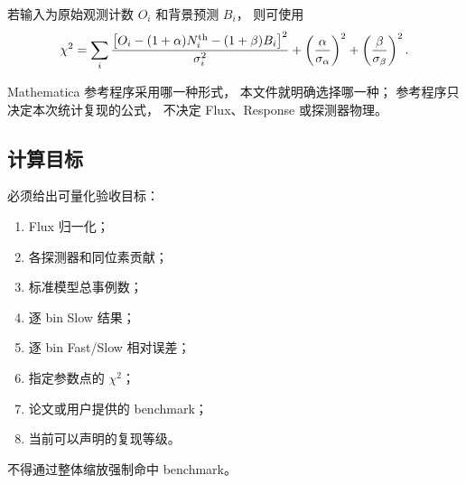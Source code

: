 若输入为原始观测计数 $O_i$ 和背景预测 $B_i$，
则可使用
\begin{equation}
  \chi^2
  =
  \sum_i
  \frac{
    \left[
      O_i
      -(1+\alpha)N_i^{\rm th}
      -(1+\beta)B_i
    \right]^2
  }{
    \sigma_i^2
  }
  +
  \left(
    \frac{\alpha}{\sigma_\alpha}
  \right)^2
  +
  \left(
    \frac{\beta}{\sigma_\beta}
  \right)^2.
\end{equation}

Mathematica 参考程序采用哪一种形式，
本文件就明确选择哪一种；
参考程序只决定本次统计复现的公式，
不决定 Flux、Response 或探测器物理。

\subsection{计算目标}

必须给出可量化验收目标：
\begin{enumerate}
  \item Flux 归一化；
  \item 各探测器和同位素贡献；
  \item 标准模型总事例数；
  \item 逐 bin Slow 结果；
  \item 逐 bin Fast/Slow 相对误差；
  \item 指定参数点的 $\chi^2$；
  \item 论文或用户提供的 benchmark；
  \item 当前可以声明的复现等级。
\end{enumerate}

不得通过整体缩放强制命中 benchmark。
